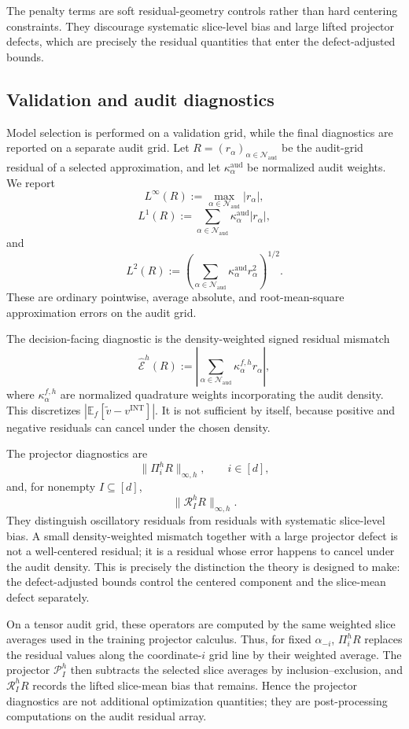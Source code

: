 \documentclass[11pt,letterpaper]{article}
\theoremstyle{definition}
\theoremstyle{remark}
\newcommand{\INT}{\mathrm{INT}}
\newcommand{\aud}{\mathrm{aud}}
\begin{document}
The penalty terms are soft residual-geometry controls rather than hard
centering constraints. They discourage systematic slice-level bias and large lifted projector defects, which are precisely the residual quantities that enter the defect-adjusted bounds.

\subsection{Validation and audit diagnostics } 
\label{subsec:framework_validation_audit}

Model selection is performed on a validation grid, while the final diagnostics
are reported on a separate audit grid. Let
$R=(r_\alpha)_{\alpha\in\mathcal N_{\aud}}$ be the audit-grid residual of a
selected approximation, and let $\kappa_\alpha^{\aud}$ be normalized audit
weights. We report
$$
L^\infty(R):=\max_{\alpha\in\mathcal N_{\aud}}|r_\alpha|,
$$
$$
L^1(R):=
\sum_{\alpha\in\mathcal N_{\aud}}
\kappa_\alpha^{\aud}|r_\alpha|,
$$
and
$$
L^2(R):=
\left(
\sum_{\alpha\in\mathcal N_{\aud}}
\kappa_\alpha^{\aud}r_\alpha^2
\right)^{1/2}.
$$
These are ordinary pointwise, average absolute, and root-mean-square
approximation errors on the audit grid.

The decision-facing diagnostic is the density-weighted signed residual
mismatch
$$
\widehat{\mathcal E}^h(R)
:=
\left|
\sum_{\alpha\in\mathcal N_{\aud}}
\kappa_\alpha^{f,h}r_\alpha
\right|,
$$
where $\kappa_\alpha^{f,h}$ are normalized quadrature weights incorporating the
audit density. This discretizes $|\mathbb E_f[\widetilde v-v^{\INT}]|$. It is
not sufficient by itself, because positive and negative residuals can cancel
under the chosen density.

The projector diagnostics are
$$
\|\Pi_i^hR\|_{\infty,h},
\qquad i\in[d],
$$
and, for nonempty $I\subseteq[d]$,
$$
\|\mathcal R_I^hR\|_{\infty,h}.
$$
They distinguish oscillatory residuals from residuals with systematic
slice-level bias. A small density-weighted mismatch together with a large
projector defect is not a well-centered residual; it is a residual whose error
happens to cancel under the audit density. This is precisely the distinction
the theory is designed to make: the defect-adjusted bounds control the
centered component and the slice-mean defect separately.

On a tensor audit grid, these operators are computed by the same weighted
slice averages used in the training projector calculus. Thus, for fixed
$\alpha_{-i}$, $\Pi_i^hR$ replaces the residual values along the coordinate-$i$
grid line by their weighted average. The projector $\mathcal P_I^h$ then
subtracts the selected slice averages by inclusion--exclusion, and
$\mathcal R_I^hR$ records the lifted slice-mean bias that remains. Hence the
projector diagnostics are not additional optimization quantities; they are
post-processing computations on the audit residual array.
\end{document}
